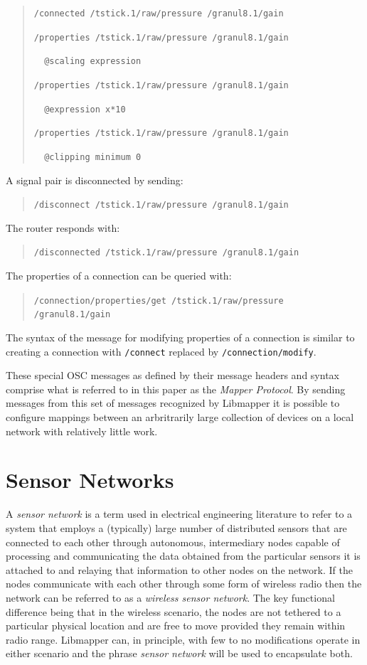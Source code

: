\begin{quote}
\verb#/connected /tstick.1/raw/pressure /granul8.1/gain#

\verb#/properties /tstick.1/raw/pressure /granul8.1/gain#

\verb#  @scaling expression#

\verb#/properties /tstick.1/raw/pressure /granul8.1/gain#

\verb#  @expression x*10#

\verb#/properties /tstick.1/raw/pressure /granul8.1/gain#

\verb#  @clipping minimum 0#
\end{quote}

A signal pair is disconnected by sending:

\begin{quote}
\verb#/disconnect /tstick.1/raw/pressure /granul8.1/gain#
\end{quote}

The router responds with:

\begin{quote}
\verb#/disconnected /tstick.1/raw/pressure /granul8.1/gain#
\end{quote}

The properties of a connection can be queried with:

\begin{quote}
\verb#/connection/properties/get /tstick.1/raw/pressure /granul8.1/gain#
\end{quote}

The syntax of the message for modifying properties of a connection is similar to creating a connection with \verb#/connect# replaced by \verb#/connection/modify#.

These special OSC messages as defined by their message headers and syntax comprise what is referred to in this paper as the \emph{Mapper Protocol}. By sending messages from this set of messages recognized by Libmapper it is possible to configure mappings between an arbritrarily large collection of devices on a local network with relatively little work.

\section{Sensor Networks}

A \emph{sensor network} is a term used in electrical engineering literature to refer to a system that employs a (typically) large number of distributed sensors that are connected to each other through autonomous, intermediary nodes capable of processing and communicating the data obtained from the particular sensors it is attached to and relaying that information to other nodes on the network. If the nodes communicate with each other through some form of wireless radio then the network can be referred to as a \emph{wireless sensor network}. The key functional difference being that in the wireless scenario, the nodes are not tethered to a particular physical location and are free to move provided they remain within radio range. Libmapper can, in principle, with few to no modifications operate in either scenario and the phrase \emph{sensor network} will be used to encapsulate both.

